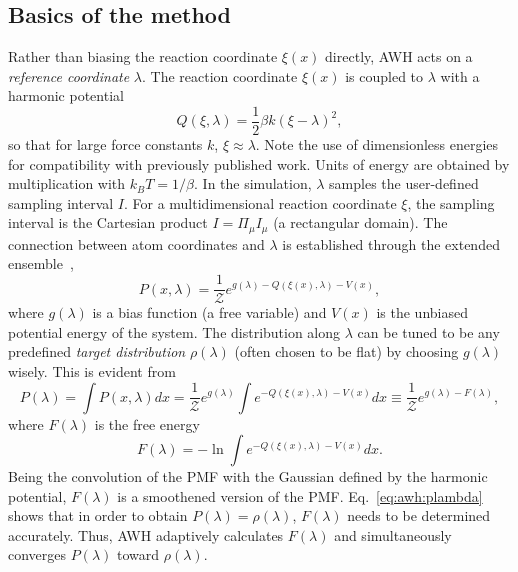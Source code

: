 \subsection{Basics of the method}
Rather than biasing the reaction coordinate $\xi(x)$  directly, AWH acts on a \emph{reference coordinate}  $\lambda$.
The reaction coordinate $\xi(x)$ is coupled to $\lambda$ with a harmonic potential 
\begin{equation}
Q(\xi,\lambda) = \frac{1}{2} \beta k (\xi - \lambda)^2,
\end{equation}
so that for large force constants $k$, $\xi \approx \lambda$.
Note the use of dimensionless energies for compatibility with previously published work.
Units of energy are obtained by multiplication with $k_BT=1/\beta$.
In the simulation, $\lambda$ samples the user-defined sampling interval $I$.
For a multidimensional reaction coordinate $\xi$, the sampling interval is the Cartesian product
$I=\Pi_\mu I_\mu$ (a rectangular domain).
The connection between atom coordinates and $\lambda$ is established through the extended ensemble~\cite{Lyubartsev1992},
\begin{equation}\label{eq:awh:pxlambda}
P(x,\lambda) = \frac{1}{\mathcal{Z}}e^{g(\lambda) - Q(\xi(x),\lambda) - V(x)},
\end{equation}
where $g(\lambda)$ is a bias function (a free variable) and $V(x)$ is the unbiased potential energy of the system.
The distribution along $\lambda$ can be 
tuned to be any predefined \emph{target distribution} $\rho(\lambda)$ (often chosen to be flat)
by choosing $g(\lambda)$ wisely.
This is evident from
\begin{equation}\label{eq:awh:plambda}
P(\lambda) = \int P(x,\lambda)  dx = 
\frac{1}{\mathcal{Z}}e^{g(\lambda)} \int e^{- Q(\xi(x),\lambda) - V(x)}  dx 
\equiv \frac{1}{\mathcal{Z}}e^{g(\lambda) - F(\lambda)},
\end{equation}
where $F(\lambda)$ is the free energy 
\begin{equation}\label{eq:awh:flambda}
F(\lambda) = -\ln \int e^{- Q(\xi(x),\lambda) - V(x)}  dx.
\end{equation}
Being the convolution of the PMF with the Gaussian defined by the harmonic potential,
$F(\lambda)$ is a smoothened version of the PMF.
Eq.~\ref{eq:awh:plambda} shows that in order to obtain $P(\lambda)=\rho(\lambda)$,
$F(\lambda)$ needs to be determined accurately.
Thus, AWH adaptively calculates $F(\lambda)$  and simultaneously converges $P(\lambda)$ toward $\rho(\lambda)$.

